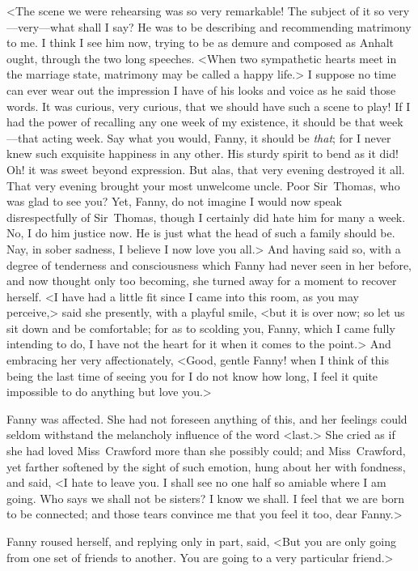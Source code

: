 <The scene we were rehearsing was so very remarkable! The subject of it so very—very—what shall I say? He was to be describing and recommending matrimony to me. I think I see him now, trying to be as demure and composed as Anhalt ought, through the two long speeches. <When two sympathetic hearts meet in the marriage state, matrimony may be called a happy life.> I suppose no time can ever wear out the impression I have of his looks and voice as he said those words. It was curious, very curious, that we should have such a scene to play! If I had the power of recalling any one week of my existence, it should be that week—that acting week. Say what you would, Fanny, it should be \textit{that}; for I never knew such exquisite happiness in any other. His sturdy spirit to bend as it did! Oh! it was sweet beyond expression. But alas, that very evening destroyed it all. That very evening brought your most unwelcome uncle. Poor Sir~Thomas, who was glad to see you? Yet, Fanny, do not imagine I would now speak disrespectfully of Sir~Thomas, though I certainly did hate him for many a week. No, I do him justice now. He is just what the head of such a family should be. Nay, in sober sadness, I believe I now love you all.> And having said so, with a degree of tenderness and consciousness which Fanny had never seen in her before, and now thought only too becoming, she turned away for a moment to recover herself. <I have had a little fit since I came into this room, as you may perceive,> said she presently, with a playful smile, <but it is over now; so let us sit down and be comfortable; for as to scolding you, Fanny, which I came fully intending to do, I have not the heart for it when it comes to the point.> And embracing her very affectionately, <Good, gentle Fanny! when I think of this being the last time of seeing you for I do not know how long, I feel it quite impossible to do anything but love you.>

Fanny was affected. She had not foreseen anything of this, and her feelings could seldom withstand the melancholy influence of the word <last.> She cried as if she had loved Miss~Crawford more than she possibly could; and Miss~Crawford, yet farther softened by the sight of such emotion, hung about her with fondness, and said, <I hate to leave you. I shall see no one half so amiable where I am going. Who says we shall not be sisters? I know we shall. I feel that we are born to be connected; and those tears convince me that you feel it too, dear Fanny.>

Fanny roused herself, and replying only in part, said, <But you are only going from one set of friends to another. You are going to a very particular friend.>

